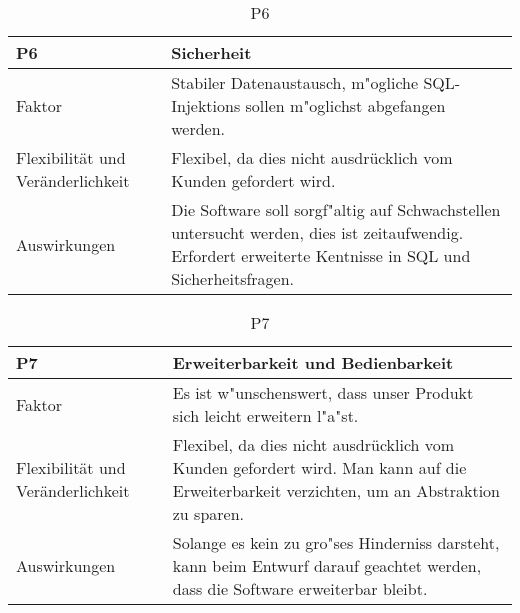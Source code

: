 \begin{table}[H]
\caption{P6}
\begin{tabular}{|p{3cm}|p{12cm}|}\hline
\textbf{P6} &  \textbf{Sicherheit} \\ \hline \hline
Faktor & Stabiler Datenaustausch, m"ogliche SQL-Injektions sollen m"oglichst abgefangen werden.\\ \hline
Flexibilität und Veränderlichkeit & Flexibel, da dies nicht ausdrücklich vom Kunden gefordert wird.\\ \hline
Auswirkungen & Die Software soll sorgf"altig auf Schwachstellen untersucht werden, dies ist zeitaufwendig. Erfordert erweiterte Kentnisse in SQL und Sicherheitsfragen.\\ \hline
\end{tabular}
\end{table}

\begin{table}[H]
\caption{P7}
\begin{tabular}{|p{3cm}|p{12cm}|}\hline
\textbf{P7} &  \textbf{Erweiterbarkeit und Bedienbarkeit} \\ \hline \hline
Faktor & Es ist w"unschenswert, dass unser Produkt sich leicht erweitern l"a"st.\\ \hline
Flexibilität und Veränderlichkeit & Flexibel, da dies nicht ausdrücklich vom Kunden gefordert wird. Man kann auf die Erweiterbarkeit verzichten, um an Abstraktion zu sparen.\\ \hline
Auswirkungen & Solange es kein zu gro"ses Hinderniss darsteht, kann beim Entwurf darauf geachtet werden, dass die Software erweiterbar bleibt.\\ \hline
\end{tabular}
\end{table}

